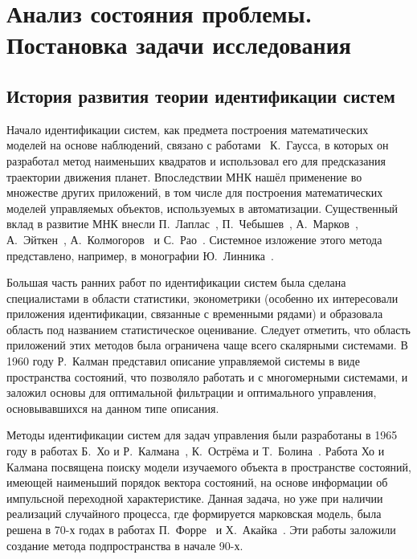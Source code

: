 \chapter[Анализ состояния проблемы. Постановка задачи исследования]{%
  Анализ состояния проблемы. \hspace{2cm}
  Постановка задачи исследования
}

\section[История развития теории идентификации систем]{%
  История развития теории идентификации систем
}

Начало идентификации систем, как предмета построения математических моделей на основе наблюдений,
связано с работами~\cite{gauss_1809, gauss_1810, gauss_1821} К.~Гаусса,
в которых он разработал метод наименьших квадратов и использовал его для предсказания
траектории движения планет.
Впоследствии МНК нашёл применение во множестве других приложений,
в том числе для построения математических моделей управляемых объектов,
используемых в автоматизации.
Существенный вклад в развитие МНК внесли
П.~Лаплас~\cite{laplace_1812},
П.~Чебышев~\cite{chebyshev_1859},
А.~Марков~\cite{markov_1898},
А.~Эйткен~\cite{aitken_1935},
А.~Колмогоров~\cite{kolmogorov_1946} и
С.~Рао~\cite{rao_1946}.
Системное изложение этого метода представлено, например, в монографии Ю.~Линника~\cite{linnik62}.

Большая часть ранних работ по идентификации систем была сделана специалистами в области статистики,
эконометрики (особенно их интересовали приложения идентификации, связанные с временными рядами) и
образовала область под названием статистическое оценивание.
Следует отметить, что область приложений этих методов была ограничена чаще всего скалярными системами.
В 1960 году Р.~Калман представил описание управляемой системы в виде пространства состояний,
что позволяло работать и с многомерными системами,
и заложил основы для оптимальной фильтрации и оптимального управления,
основывавшихся на данном типе описания.

Методы идентификации систем для задач управления были разработаны в 1965 году в работах
Б.~Хо и Р.~Калмана~\cite{ho_1965}, К.~Острёма и Т.~Болина~\cite{astrom_1965}.
Работа Хо и Калмана посвящена поиску модели изучаемого объекта в пространстве состояний,
имеющей наименьший порядок вектора состояний,
на основе информации об импульсной переходной характеристике.
Данная задача, но уже при наличии реализаций случайного процесса, где формируется марковская модель,
была решена в 70-х годах в работах П.~Форре~\cite{faurre_1973} и Х.~Акайка~\cite{akaike_1974}.
Эти работы заложили создание метода подпространства в начале 90-х.

